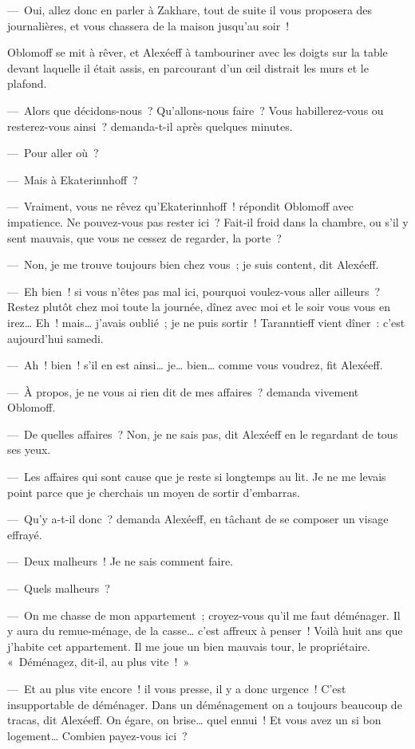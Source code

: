 \documentclass[french,twoside]{book} %
\begin{document}
— Oui, allez donc en parler à Zakhare, tout de suite il vous proposera des journalières, et vous chassera de la maison jusqu’au soir !\par
Oblomoff se mit à rêver, et Alexéeff à tambouriner avec les doigts sur la table devant laquelle il était assis, en parcourant d’un œil distrait les murs et le plafond.\par
— Alors que décidons-nous ? Qu’allons-nous faire ? Vous habillerez-vous ou resterez-vous ainsi ? demanda-t-il après quelques minutes.\par
— Pour aller où ?\par
— Mais à Ekaterinnhoff ?\par
— Vraiment, vous ne rêvez qu’Ekaterinnhoff ! répondit Oblomoff avec impatience. Ne pouvez-vous pas rester ici ? Fait-il froid dans la chambre, ou s’il y sent mauvais, que vous ne cessez de regarder, la porte ?\par
— Non, je me trouve toujours bien chez vous ; je suis content, dit Alexéeff.\par
— Eh bien ! si vous n’êtes pas mal ici, pourquoi voulez-vous aller ailleurs ? Restez plutôt chez moi toute la journée, dînez avec moi et le soir vous vous en irez… Eh ! mais… j’avais oublié ; je ne puis sortir ! Taranntieff vient dîner : c’est aujourd’hui samedi.\par
— Ah ! bien ! s’il en est ainsi… je… bien… comme vous voudrez, fit Alexéeff.\par
— À propos, je ne vous ai rien dit de mes affaires ? demanda vivement Oblomoff.\par
— De quelles affaires ? Non, je ne sais pas, dit Alexéeff en le regardant de tous ses yeux.\par
— Les affaires qui sont cause que je reste si longtemps au lit. Je ne me levais point parce que je cherchais un moyen de sortir d’embarras.\par
— Qu’y a-t-il donc ? demanda Alexéeff, en tâchant de se composer un visage effrayé.\par
— Deux malheurs ! Je ne sais comment faire.\par
— Quels malheurs ?\par
— On me chasse de mon appartement ; croyez-vous qu’il me faut déménager. Il y aura du remue-ménage, de la casse… c’est affreux à penser ! Voilà huit ans que j’habite cet appartement. Il me joue un bien mauvais tour, le propriétaire. « Déménagez, dit-il, au plus vite ! »\par
— Et au plus vite encore ! il vous presse, il y a donc urgence ! C’est insupportable de déménager. Dans un déménagement on a toujours beaucoup de tracas, dit Alexéeff. On égare, on brise… quel ennui ! Et vous avez un si bon logement… Combien payez-vous ici ?\par
\end{document}
